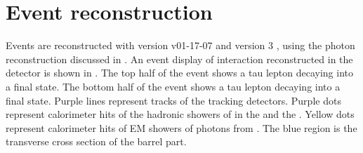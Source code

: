 \section{Event reconstruction}
\label{sec:tauReco}

Events are reconstructed with  \ilcsoft version v01-17-07 \cite{Gaede:82475} and \pandora version 3 \cite{Marshall:2015rfa}, using the photon reconstruction discussed in . An event display of \eeToTauTau interaction reconstructed in the \ILD detector is shown in . The top half of the event shows a tau lepton decaying into a \decayRhoFinalState final state. The bottom half of the event shows a tau lepton decaying into a \decayThreePionPhoton final state. Purple lines represent \Ppipm tracks of the tracking detectors. Purple dots represent  calorimeter hits of the hadronic showers of \Ppipm in the \ECAL and the \HCAL. Yellow dots represent calorimeter hits of EM showers of photons  from \HepProcess{\Ppizero \to \Pphoton \Pphoton}. The blue region is the transverse cross section of the \ECAL barrel part.



